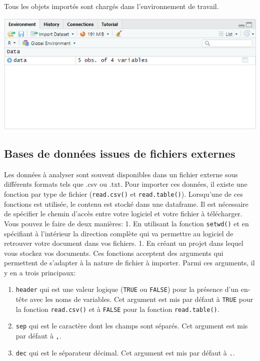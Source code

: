\documentclass[
]{book}
\providecommand{\tightlist}{%
  \setlength{\itemsep}{0pt}\setlength{\parskip}{0pt}}
\begin{document}
Tous les objets importés sont chargés dans l'environnement de travail.

\includegraphics[width=8.47in]{images/environment_forRDataDownload}

\subsection{Bases de données issues de fichiers externes}\label{bases-de-donnuxe9es-issues-de-fichiers-externes}

Les données à analyser sont souvent disponibles dans un fichier externe sous différents formats tels que .csv ou .txt. Pour importer ces données, il existe une fonction par type de fichier (\texttt{read.csv()} et \texttt{read.table()}). Lorsqu'une de ces fonctions est utilisée, le contenu est stocké dans une dataframe. Il est nécessaire de spécifier le chemin d'accès entre votre logiciel et votre fichier à télécharger. Vous pouvez le faire de deux manières: 1. En utilisant la fonction \texttt{setwd()} et en spécifiant à l'intérieur la direction complète qui va permettre au logiciel de retrouver votre document dans vos fichiers. 1. En créant un projet dans lequel vous stockez vos documents. Ces fonctions acceptent des arguments qui permettent de s'adapter à la nature de fichier à importer. Parmi ces arguments, il y en a trois principaux:

\begin{enumerate}
\def\labelenumi{\arabic{enumi}.}
\tightlist
\item
  \texttt{header} qui est une valeur logique (\texttt{TRUE} ou \texttt{FALSE}) pour la présence d'un en-tête avec les noms de variables. Cet argument est mis par défaut à \texttt{TRUE} pour la fonction \texttt{read.csv()} et à \texttt{FALSE} pour la fonction \texttt{read.table()}.
\item
  \texttt{sep} qui est le caractère dont les champs sont séparés. Cet argument est mis par défaut à \texttt{,}.
\item
  \texttt{dec} qui est le séparateur décimal. Cet argument est mis par défaut à \texttt{.}.
\end{enumerate}
\end{document}
